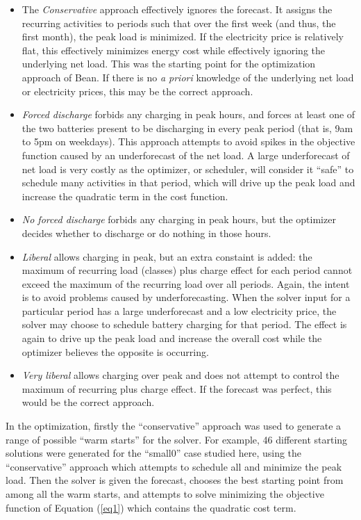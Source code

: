 \documentclass[conference]{IEEEtran}
\begin{document}
\begin{itemize}
    \item The {\it Conservative} approach effectively ignores the forecast. It assigns the recurring activities to periods such that over the first week (and thus, the first month), the peak load is minimized. If the electricity price is relatively flat, this effectively minimizes energy cost while effectively ignoring the underlying net load. This was the starting point for the optimization approach of Bean. If there is no {\it a priori} knowledge of the underlying net load or electricity prices, this may be the correct approach.

    \item {\it Forced discharge} forbids any charging in peak hours, and forces at least one of the two batteries present to be discharging in every peak period (that is, 9am to 5pm on weekdays). This approach attempts to avoid spikes in the objective function caused by an underforecast of the net load. A large underforecast of net load is very costly as the optimizer, or scheduler, will consider it ``safe'' to schedule many activities in that period, which will drive up the peak load and increase the quadratic term in the cost function.

    \item {\it No forced discharge} forbids any charging in peak hours, but the optimizer decides whether to discharge or do nothing in those hours.

    \item {\it Liberal} allows charging in peak, but an extra constaint is added: the maximum of recurring load (classes) plus charge effect for each period cannot exceed the maximum of the recurring load over all periods. Again, the intent is to avoid problems caused by underforecasting. When the solver input for a particular period has a large underforecast and a low electricity price, the solver may choose to schedule battery charging for that period. The effect is again to drive up the peak load and increase the overall cost while the optimizer believes the opposite is occurring.

    \item {\it Very liberal} allows charging over peak and does not attempt to control the maximum of recurring plus charge effect. If the forecast was perfect, this would be the correct approach.
\end{itemize}

In the optimization, firstly the ``conservative'' approach was used to generate a range of possible ``warm starts'' for the solver. For example, 46 different starting solutions were generated for the ``small0'' case studied here, using the ``conservative'' approach which attempts to schedule all and minimize the peak load. Then the solver is given the forecast, chooses the best starting point from among all the warm starts, and attempts to solve minimizing the objective function of Equation (\ref{eq1}) which contains the quadratic cost term.
\end{document}

